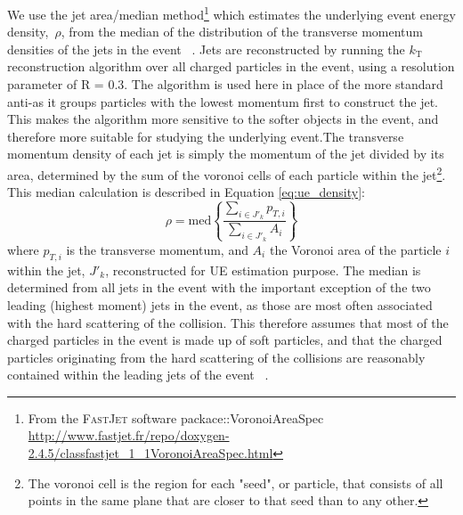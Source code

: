 We use the jet area/median method\footnote{From the \textsc{FastJet} software packace::VoronoiAreaSpec \url{http://www.fastjet.fr/repo/doxygen-2.4.5/classfastjet_1_1VoronoiAreaSpec.html} } which estimates the underlying event energy density,~$\rho$, from the median of the distribution of the transverse momentum densities of the jets in the event ~\cite{Cacciari:2009dp}. Jets are reconstructed by running the $k_\mathrm{T}$ reconstruction algorithm over all charged particles in the event, using a resolution parameter of R = 0.3. The \kt algorithm is used here in place of the more standard anti-\kt as it groups particles with the lowest momentum first to construct the jet. This makes the \kt algorithm more sensitive to the softer objects in the event, and therefore more suitable for studying the underlying event.The transverse momentum density of each jet is simply the momentum of the jet divided by its area, determined by the sum of the voronoi cells of each particle within the jet\footnote{The voronoi cell is the region for each "seed", or particle, that  consists of all points in the same  plane that are closer to that seed than to any other.}. 
 This median calculation is described in Equation \ref{eq:ue_density}:
\begin{equation}
\label{eq:ue_density}
  \rho = \mathrm{med} \left\{ \frac{\sum_{i\in J'_k}
    p_{T,i}}{\sum_{i\in J'_k} A_i} \right\}
\end{equation}
where $p_{T,i}$ is the transverse momentum, and $A_i$ the Voronoi area of the particle $i$ within the jet, $J'_k$, reconstructed for UE estimation purpose.  The median is determined from all jets in the event with the important exception of the two leading (highest moment) jets in the event, as those are most often associated with the hard scattering of the collision. This therefore assumes that most of the charged particles in the event is made up of soft particles, and that the charged particles originating from the hard scattering of the collisions are reasonably contained within the leading jets of the event ~\cite{Cacciari:2009dp}.\\

